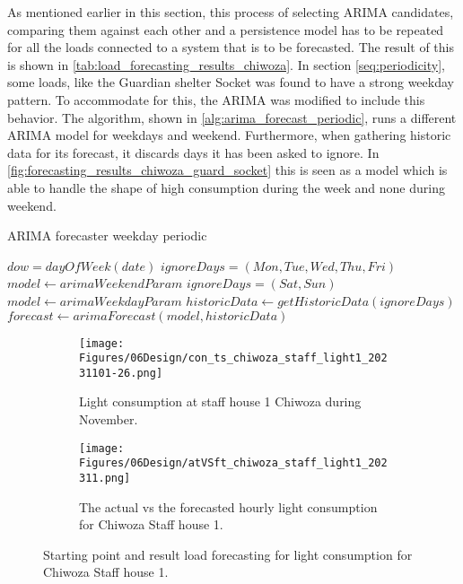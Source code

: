 As mentioned earlier in this section, this process of selecting ARIMA candidates, comparing them against each other and a persistence model has to be repeated for all the loads connected to a system that is to be forecasted. The result of this is shown in \ref{tab:load_forecasting_results_chiwoza}. In section \ref{seq:periodicity}, some loads, like the Guardian shelter Socket was found to have a strong weekday pattern. To accommodate for this, the ARIMA was modified to include this behavior. The algorithm, shown in \ref{alg:arima_forecast_periodic}, runs a different ARIMA model for weekdays and weekend. Furthermore, when gathering historic data for its forecast, it discards days it has been asked to ignore. In \ref{fig:forecasting_results_chiwoza_guard_socket} this is seen as a model which is able to handle the shape of high consumption during the week and none during weekend.

\begin{algorithm}
\caption{ARIMA forecaster weekday periodic}\label{alg:arima_forecast_periodic}
\begin{algorithmic}
    \State$dow = dayOfWeek(date) $
        \State$ignoreDays = (Mon,Tue,Wed,Thu,Fri)$
        \State$model \gets arimaWeekendParam$
    \Else
        \State$ignoreDays = (Sat,Sun)$
        \State$model \gets arimaWeekdayParam$
    \EndIf
    \State$historicData \gets getHistoricData(ignoreDays)$
    \State$forecast \gets arimaForecast(model, historicData)$
\end{algorithmic}
\end{algorithm}

\begin{figure}
    \begin{subfigure}{\textwidth}
    \centering
    \texttt{[image: Figures/06Design/con\_ts\_chiwoza\_staff\_light1\_20231101-26.png]}
    \caption{Light consumption at staff house 1 Chiwoza during November.}
    \label{fig:con_ts_chiwoza_staff_light1_20231101-26}
  \end{subfigure}

  \vspace{0.5cm}

  \begin{subfigure}{\textwidth}
    \centering
    \texttt{[image: Figures/06Design/atVSft\_chiwoza\_staff\_light1\_202311.png]}
    \caption{The actual vs the forecasted hourly light consumption for Chiwoza Staff house 1.}
    \label{fig:atVSft_chiwoza_staff_light1_202311}
  \end{subfigure}

  \caption[Light consumption staff house 1 forecasting]{Starting point and result load forecasting for light consumption for Chiwoza Staff house 1.}
  \label{fig:forecasting_results_chiwoza_staff_light1}
\end{figure}

